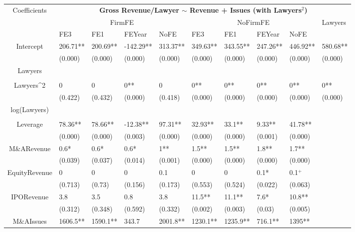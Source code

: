 \documentclass{article}
\begin{document}
\begin{table}[H]
\centering
\begin{tabular}{|clllllllll|}
\hline
\multirow{3}{*}{Coefficients} & \multicolumn{9}{c|}{\textbf{Gross Revenue/Lawyer $\sim$ Revenue + Issues (with Lawyers$^2$)}} \\
\cline{2-10}
& \multicolumn{4}{c}{FirmFE} & \multicolumn{4}{c}{NoFirmFE} & \multirow{2}{*}{Lawyers} \\
\cline{2-9}
& FE3 & FE1 & FEYear & NoFE & FE3 & FE1 & FEYear & NoFE &  \\
\hline
 
Intercept & 206.71** & 200.69** & -142.29** & 313.37** & 349.63** & 343.55** & 247.26** & 446.92** & 580.68** \\ 
   & (0.000) & (0.000) & (0.000) & (0.000) & (0.000) & (0.000) & (0.000) & (0.000) & (0.000) \\ 
  Lawyers &  &  &  &  &  &  &  &  &  \\ 
   &  &  &  &  &  &  &  &  &  \\ 
  Lawyers^2 & 0 & 0 & 0** & 0 & 0** & 0** & 0** & 0** & 0** \\ 
   & (0.422) & (0.432) & (0.000) & (0.418) & (0.000) & (0.000) & (0.000) & (0.000) & (0.000) \\ 
  log(Lawyers) &  &  &  &  &  &  &  &  &  \\ 
   &  &  &  &  &  &  &  &  &  \\ 
  Leverage & 78.36** & 78.66** & -12.38** & 97.31** & 32.93** & 33.1** & 9.33** & 41.78** &  \\ 
   & (0.000) & (0.000) & (0.003) & (0.000) & (0.000) & (0.000) & (0.001) & (0.000) &  \\ 
  M\&ARevenue & 0.6* & 0.6* & 0.6* & 1** & 1.5** & 1.5** & 1.8** & 1.7** &  \\ 
   & (0.039) & (0.037) & (0.014) & (0.001) & (0.000) & (0.000) & (0.000) & (0.000) &  \\ 
  EquityRevenue & 0 & 0 & 0 & 0.1 & 0 & 0 & 0.1* & 0.1$^{+}$ &  \\ 
   & (0.713) & (0.73) & (0.156) & (0.173) & (0.553) & (0.524) & (0.022) & (0.063) &  \\ 
  IPORevenue & 3.8 & 3.5 & 0.8 & 3.8 & 11.5** & 11.1** & 7.6* & 10.8** &  \\ 
   & (0.312) & (0.348) & (0.592) & (0.332) & (0.002) & (0.003) & (0.03) & (0.005) &  \\ 
  M\&AIssues & 1606.5** & 1590.1** & 343.7 & 2001.8** & 1230.1** & 1235.9** & 716.1** & 1395** &  \\ 

\end{tabular}
\end{table}
\end{document}
